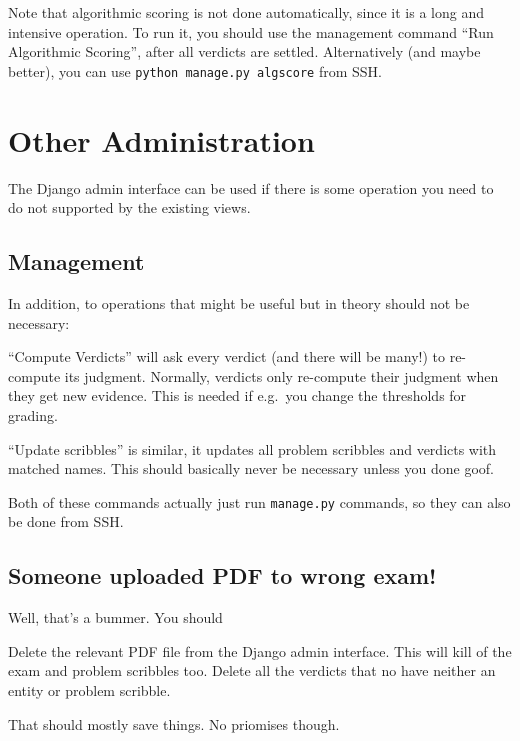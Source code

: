 Note that algorithmic scoring is not done automatically,
since it is a long and intensive operation.
To run it, you should use the management command
``Run Algorithmic Scoring'',
after all verdicts are settled.
Alternatively (and maybe better), you can use
\verb+python manage.py algscore+ from SSH.

\section{Other Administration}
The Django admin interface can be used if there
is some operation you need to do not supported by the existing views.

\subsection{Management}
In addition, to operations that might be useful
but in theory should not be necessary:
\begin{itemize}
	\ii ``Compute Verdicts'' will ask every verdict (and there will be many!)
	to re-compute its judgment.
	Normally, verdicts only re-compute their judgment when they get new evidence.
	This is needed if e.g.\ you change the thresholds for grading.

	\ii ``Update scribbles'' is similar,
	it updates all problem scribbles and verdicts
	with matched names.
	This should basically never be necessary unless you done goof.
\end{itemize}
Both of these commands actually just run \verb+manage.py+ commands,
so they can also be done from SSH.

\subsection{Someone uploaded PDF to wrong exam!}
Well, that's a bummer.  You should
\begin{itemize}
	\ii Delete the relevant PDF file from the Django admin interface.
	This will kill of the exam and problem scribbles too.
	\ii Delete all the verdicts that no have neither an entity or problem scribble.
\end{itemize}
That should mostly save things. No priomises though.
